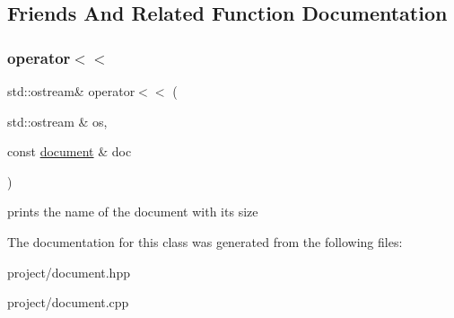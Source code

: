 \subsection{Friends And Related Function Documentation}
\mbox{\label{classdocument_af474a7f5ba29bca5df031898e86a8687}} 
\subsubsection{\texorpdfstring{operator$<$$<$}{operator<<}}
{\footnotesize\ttfamily std\+::ostream\& operator$<$$<$ (\begin{DoxyParamCaption}\item[{std\+::ostream \&}]{os,  }\item[{const \hyperlink{classdocument}{document} \&}]{doc }\end{DoxyParamCaption})\hspace{0.3cm}{\ttfamily [friend]}}

prints the name of the document with its size 

The documentation for this class was generated from the following files\+:\begin{DoxyCompactItemize}
\item 
project/document.\+hpp\item 
project/document.\+cpp\end{DoxyCompactItemize}
